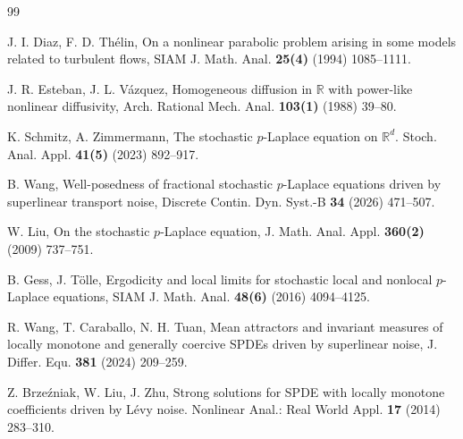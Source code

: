 \documentclass[11pt]{article}
\numberwithin{equation}{section}
\theoremstyle{plain}
\begin{document}
%


\begin{thebibliography}{99}



    J. I. Diaz, F. D. Th\'{e}lin,  
    On a nonlinear parabolic problem arising in some models related to turbulent flows,
    SIAM J. Math. Anal. \textbf{25(4)} (1994) 1085--1111.

    J. R. Esteban, J. L. V\'{a}zquez, 
    Homogeneous diffusion in $\mathbb{R}$ with power-like nonlinear diffusivity,
    Arch. Rational Mech. Anal. \textbf{103(1)} (1988) 39--80.
     
	

	K. Schmitz, A. Zimmermann, The stochastic $p$-Laplace equation on $\mathbb{R}^d$. Stoch. Anal. Appl. \textbf{41(5)} (2023) 892--917.
	
	B. Wang,
	Well-posedness of fractional stochastic $p$-Laplace equations driven by superlinear transport noise,
	Discrete Contin. Dyn. Syst.-B \textbf{34} (2026) 471--507.	
	

	W. Liu, 
	On the stochastic $p$-Laplace equation,
	J. Math. Anal. Appl. \textbf{360(2)} (2009) 737--751.	
	
	B. Gess, J. T\"{o}lle,
	Ergodicity and local limits for stochastic local and nonlocal $p$-Laplace equations,
	SIAM J. Math. Anal.  \textbf{48(6)} (2016) 4094--4125.	
	
	R. Wang, T. Caraballo, N. H. Tuan, 
	Mean attractors and invariant measures of locally monotone and generally coercive SPDEs driven by superlinear noise, 
	J. Differ. Equ. \textbf{381} (2024) 209--259.


     Z. Brze\'{z}niak, W. Liu, J. Zhu,
     Strong solutions for SPDE with locally monotone coefficients driven by L\'{e}vy noise. Nonlinear Anal.: Real World Appl. \textbf{17} (2014) 283--310.


\end{thebibliography}
\end{document}
